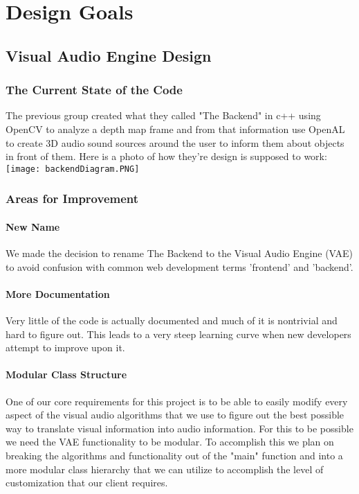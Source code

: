 \documentclass{scrreprt}
\begin{document}
\chapter{Design Goals}

\section{Visual Audio Engine Design}
\subsection{The Current State of the Code}
The previous group created what they called "The Backend" in c++ using OpenCV to analyze a depth map frame and from that information use OpenAL to create 3D audio sound sources around the user to inform them about objects in front of them. Here is a photo of how they're design is supposed to work:\\

\texttt{[image: backendDiagram.PNG]}\\
\subsection{Areas for Improvement}
\subsubsection{New Name}
We made the decision to rename The Backend to the Visual Audio Engine (VAE) to avoid confusion with common web development terms 'frontend' and 'backend'.
\subsubsection{More Documentation}
Very little of the code is actually documented and much of it is nontrivial and hard to figure out. This leads to a very steep learning curve when new developers attempt to improve upon it.\\
\subsubsection{Modular Class Structure}
One of our core requirements for this project is to be able to easily modify every aspect of the visual audio algorithms that we use to figure out the best possible way to translate visual information into audio information. For this to be possible we need the VAE functionality to be modular. To accomplish this we plan on breaking the algorithms and functionality out of the "main" function and into a more modular class hierarchy that we can utilize to accomplish the level of customization that our client requires.
\end{document}
